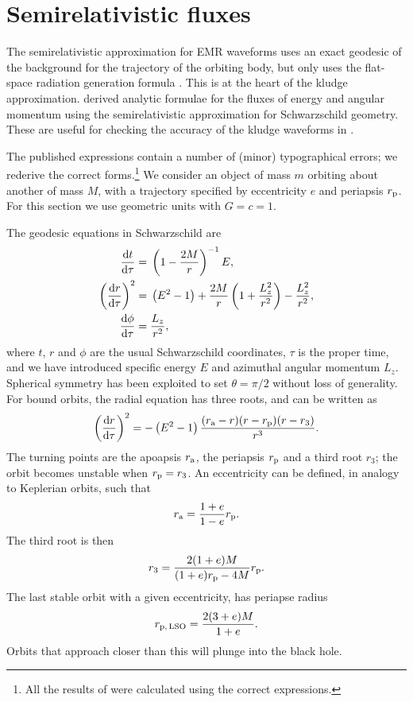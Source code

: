 \chapter{Semirelativistic fluxes}\label{ap:energy}

The semirelativistic approximation for EMR waveforms uses an exact geodesic of the background for the trajectory of the orbiting body, but only uses the flat-space radiation generation formula \citep{Ruffini1981}. This is at the heart of the kludge approximation. \citet{Gair2005} derived analytic formulae for the fluxes of energy and angular momentum using the semirelativistic approximation for Schwarzschild geometry. These are useful for checking the accuracy of the kludge waveforms in .

The published expressions contain a number of (minor) typographical errors; we rederive the correct forms.\footnote{All the results of \citet{Gair2005} were calculated using the correct expressions.} We consider an object of mass $m$ orbiting about another of mass $M$, with a trajectory specified by eccentricity $e$ and periapsis $r_\mathrm{p}$. For this section we use geometric units with $G = c = 1$.

The geodesic equations in Schwarzschild are
\begin{subequations}
\begin{align}
\dfrac{\mathrm{d} {t}}{\mathrm{d} {\tau}} = {} & \left(1-\dfrac{2M}{r}\right)^{-1}E, \\
\left(\dfrac{\mathrm{d} {r}}{\mathrm{d} {\tau}}\right)^2 = {} & \left(E^2 - 1\right) + \dfrac{2M}{r}\left(1 + \dfrac{L_z^2}{r^2}\right) - \dfrac{L_z^2}{r^2}, \\
\dfrac{\mathrm{d} {\phi}}{\mathrm{d} {\tau}} = {} & \dfrac{L_z}{r^2},
\end{align}
\end{subequations}
where $t$, $r$ and $\phi$ are the usual Schwarzschild coordinates, $\tau$ is the proper time, and we have introduced specific energy $E$ and azimuthal angular momentum $L_z$. Spherical symmetry has been exploited to set $\theta = \pi/2$ without loss of generality. For bound orbits, the radial equation has three roots, and can be written as
\begin{equation}
\left(\dfrac{\mathrm{d} {r}}{\mathrm{d} {\tau}}\right)^2 = -\left(E^2 - 1\right)\dfrac{(r_\mathrm{a} - r)(r - r_\mathrm{p})(r - r_3)}{r^3}.
\end{equation}
The turning points are the apoapsis $r_\mathrm{a}$, the periapsis $r_\mathrm{p}$ and a third root $r_3$; the orbit becomes unstable when $r_\mathrm{p} = r_3$. An eccentricity can be defined, in analogy to Keplerian orbits, such that
\begin{equation}
r_\mathrm{a} = \dfrac{1 + e}{1 - e}r_\mathrm{p}.
\end{equation}
The third root is then
\begin{equation}
r_3 = \dfrac{2(1 + e)M}{(1+e)r_\mathrm{p} - 4M}r_\mathrm{p}.
\end{equation}
The last stable orbit with a given eccentricity, has periapse radius
\begin{equation}
r_\mathrm{p,\,LSO} = \dfrac{2(3 + e)M}{1+e}.
\end{equation}
Orbits that approach closer than this will plunge into the black hole.

